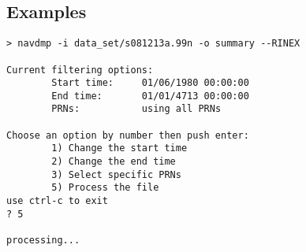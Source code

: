 \subsection{Examples}
\begin{\outputsize}
\begin{lstlisting}
> navdmp -i data_set/s081213a.99n -o summary --RINEX

Current filtering options:
        Start time:     01/06/1980 00:00:00
        End time:       01/01/4713 00:00:00
        PRNs:           using all PRNs

Choose an option by number then push enter:
        1) Change the start time
        2) Change the end time
        3) Select specific PRNs
        5) Process the file
use ctrl-c to exit
? 5

processing...
\end{lstlisting}
\end{\outputsize}

